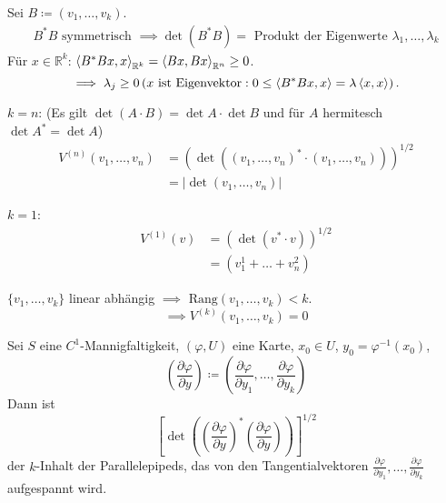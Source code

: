 \begin{notice} \label{thm:11.2}
  \begin{enum-arab}
    \item Sei $B \coloneq (v_1 ,\ldots, v_k)$.
    \begin{align*}
      B^* B \text{ symmetrisch } \implies \det(B^* B) = \text{ Produkt der Eigenwerte } \lambda_1, \ldots, \lambda_k
    \end{align*}
    Für $x \in \mathbb{R}^k$: $\braket{B^* B x, x}_{\mathbb{R}^k} = \braket{B x, B x}_{\mathbb{R}^n} \geq 0$. \[ \implies \lambda_j \geq 0 \left( x \text{ ist Eigenvektor} : 0 \leq \braket{B^* B x, x} = \lambda \braket{x, x} \right). \]
    
    \item $k=n$: (Es gilt $\det(A \cdot B) = \det A \cdot \det B$ und für $A$ hermitesch $\det A^* = \det A$)
    \begin{align*}
      V^{(n)}(v_1 ,\ldots, v_n)
      &= \left(\det \left( (v_1 ,\ldots, v_n)^* \cdot (v_1 ,\ldots, v_n)\right)\right)^{1/2} \\
      &= \left| \det (v_1 ,\ldots, v_n) \right|
    \end{align*}
    
    \item $k=1$:
    \begin{align*}
      V^{(1)}(v)
      &= \left( \det(v^* \cdot v) \right)^{1/2} \\
      &= (v_1^1 + \ldots + v_n^2)
    \end{align*}
    
    \item $\{ v_1 ,\ldots, v_k \}$ linear abhängig $\implies$ $\mathrm{Rang}(v_1,\ldots,v_k) < k$. \[ \implies V^{(k)}(v_1,\ldots,v_k) = 0 \]
    
    \item Sei $S$ eine $C^1$-Mannigfaltigkeit, $(\varphi,U)$ eine Karte, $x_0 \in U$, $y_0 = \varphi^{-1}(x_0)$,\[ \left(\frac{\partial \varphi}{\partial y}\right) \coloneq \left( \frac{\partial \varphi}{\partial y_1},\ldots,\frac{\partial \varphi}{\partial y_k} \right) \]
    Dann ist \[ \left[ \det \left( \left( \frac{\partial \varphi}{\partial y} \right)^* \left( \frac{\partial \varphi}{\partial y} \right) \right) \right]^{1/2} \]
    der $k$-Inhalt der Parallelepipeds, das von den Tangentialvektoren $\frac{\partial \varphi}{\partial y_1},\ldots,\frac{\partial \varphi}{\partial y_k}$ aufgespannt wird.
  \end{enum-arab}
\end{notice}

